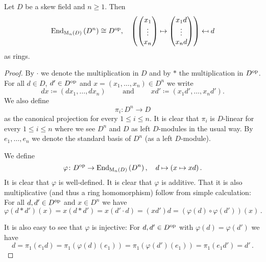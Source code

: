\begin{lemma}
  Let $D$ be a skew field and $n \geq 1$. Then
  \[
              \operatorname{End}_{\operatorname{M}_n(D)}\left(D^n\right)
    \cong     D^{\mathrm{op}},
    \quad     \left(
                        \begin{pmatrix}x_1 \\ \vdots \\ x_n\end{pmatrix}
                \mapsto \begin{pmatrix}x_1 d \\ \vdots \\ x_n d\end{pmatrix}
              \right)
    \mapsfrom d
  \]
  as rings.
\end{lemma}
\begin{proof}
  By $\cdot$ we denote the multiplication in $D$ and by $*$ the multiplication in $D^{\mathrm{op}}$.
  For all $d \in D$, $d' \in D^{\mathrm{op}}$ and $x = (x_1, \dotsc, x_n) \in D^n$ we write
  \[
              d x
    \coloneqq (d x_1, \dotsc, d x_n)
    \qquad \text{ and } \qquad
              x d'
    \coloneqq (x_1 d', \dotsc, x_n d'). 
  \]
  We also define
  \[
    \pi_i \colon D^n \to D
  \]
  as the canonical projection for every $1 \leq i \leq n$.
  It is clear that $\pi_i$ is $D$-linear for every $1 \leq i \leq n$ where we see $D^n$ and $D$ as left $D$-modules in the usual way.
  By $e_1, \dotsc, e_n$ we denote the standard basis of $D^n$ (as a left $D$-module).
  
  We define
  \[
            \varphi
    \colon  D^{\mathrm{op}}
    \to     \operatorname{End}_{\operatorname{M}_n(D)}\left( D^n \right),
    \quad   d
    \mapsto (x \mapsto x d) \,.
  \]
  It is clear that $\varphi$ is well-defined.
  It is clear that $\varphi$ is additive.
  That it is also multiplicative (and thus a ring homomorphism) follow from simple calculation:
  For all $d, d' \in D^{\mathrm{op}}$ and $x \in D^n$ we have
  \[
      \varphi(d * d')(x)
    = x (d * d')
    = x (d' \cdot d)
    = (x d') d
    = \left( \varphi(d) \circ \varphi(d') \right)(x) \,.
  \]
  
  It is also easy to see that $\varphi$ is injective:
  For $d, d' \in D^{\mathrm{op}}$ with $\varphi(d) = \varphi(d')$ we have
  \[
      d
    = \pi_1(e_1 d)
    = \pi_1(\varphi(d)(e_1))
    = \pi_1(\varphi(d')(e_1))
    = \pi_1(e_1 d')
    = d' \,.
  \]
  

\end{proof}
